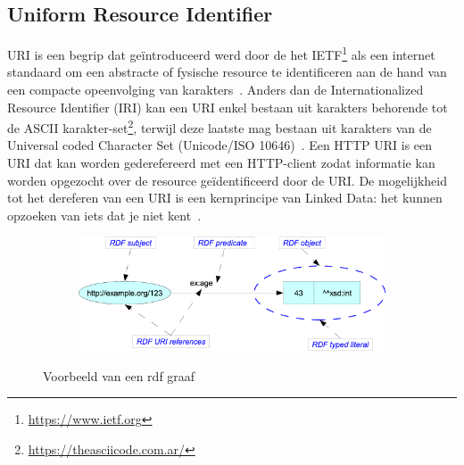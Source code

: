 \subsection{Uniform Resource Identifier}
URI is een begrip dat geïntroduceerd werd door de het IETF\footnote{\url{https://www.ietf.org}} als een internet standaard om een abstracte of fysische resource te identificeren aan de hand van een compacte opeenvolging van karakters~\cite{uri-ietf}. Anders dan de Internationalized Resource Identifier (IRI) kan een URI enkel bestaan uit karakters behorende tot de ASCII karakter-set\footnote{\url{https://theasciicode.com.ar/}}, terwijl deze laatste mag bestaan uit karakters van de Universal coded Character Set (Unicode/ISO 10646)~\cite{ucs}.
Een HTTP URI is een URI dat kan worden gederefereerd met een HTTP-client zodat informatie kan worden opgezocht over de resource geïdentificeerd door de URI. De mogelijkheid tot het dereferen van een URI is een kernprincipe van Linked Data: het kunnen opzoeken van iets dat je niet kent~\cite{verborgh_webfundamental}.

\begin{figure}
	\centering
	\begin{subfigure}{\textwidth}
		\centering
		\centerline{
			\includegraphics[scale=0.75]{images/rdfexample.png}
		}
	\end{subfigure}
	\caption{Voorbeeld van een \acrshort{rdf} graaf~\cite{rdfgraph_img}}
	\label{fig:rdf_example}
\end{figure}


